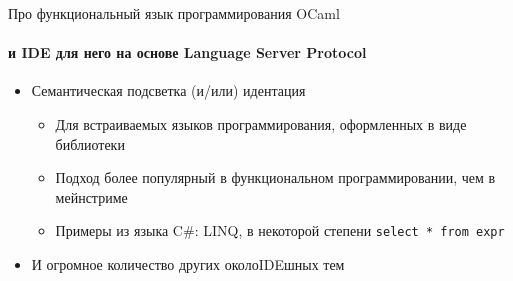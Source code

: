 \documentclass[aspectratio=169
  , xcolor={svgnames}
  , hyperref=
      { colorlinks
      , urlcolor=DarkBlue
      }
  , 12pt
  , russian  %
  ]{beamer}
\begin{document}
\begin{frame}[fragile]{Про функциональный язык программирования OCaml }
\framesubtitle{и IDE для него на основе Language Server Protocol}

\begin{itemize}
\item Семантическая подсветка (и/или) идентация \href{http://kakadu.github.io/fp2020/projects.html\#semantich-highlighting}{\faGithub}
\begin{itemize}
\item Для встраиваемых языков программирования, оформленных в виде библиотеки
\item Подход более популярный в функциональном программировании, чем в мейнстриме
\item Примеры из языка C\#: LINQ, в некоторой степени \texttt{select * from expr}
\end{itemize}\pause

\item И огромное количество других околоIDEшных тем
\end{itemize}
\end{frame}
\end{document}

